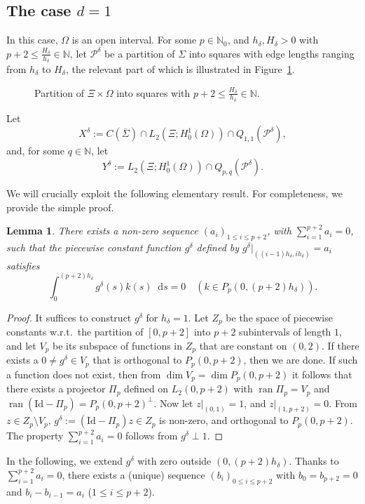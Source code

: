 \documentclass{amsart}
\newtheorem{lemma}[theorem]{Lemma}
\numberwithin{equation}{section}
\newcommand{\N}{\mathbb N}
\newcommand{\identity}{\mathrm{Id}}
\DeclareMathOperator{\ran}{ran}
\newcommand{\1}{\mathbb 1}
\newcommand*\diff{\mathop{}\!\mathrm{d}}
\newcommand{\pria}{{\mathcal P}}
\begin{document}
\subsection{The case $d=1$}
In this case, $\Omega$ is an open interval. 
For some $p \in \N_0$, and $h_\delta, H_\delta >0$ with $p+2 \leq \frac{H_\delta}{h_\delta} \in \N$, let $\pria^\delta$ be a partition of $\Sigma$ into squares with edge lengths ranging from $h_\delta$ to $H_\delta$, the relevant part of which is illustrated in Figure~\ref{fig:1}.
\begin{figure}[h]
\centering

\caption{Partition of $\Xi \times \Omega$ into squares with $p+2\le \frac{H_\delta}{h_\delta}\in\N$.}
\label{fig:1}
\end{figure}
Let
$$
X^\delta := C(\overline{\Sigma}) \cap L_2(\Xi;H_0^1(\Omega)) \cap Q_{1,1}(\pria^\delta),
$$
and, for some $q \in \N$, let 
$$
Y^\delta:=L_2(\Xi;H_0^1(\Omega)) \cap Q_{p,q}(\pria^{\delta}).
$$

We will crucially exploit the following elementary result. For completeness, we provide the simple proof.

\begin{lemma}
There exists a non-zero sequence $(a_i)_{1 \leq i \leq p+2}$, with $\sum_{i=1}^{p+2} a_i=0$, such that the piecewise constant function $g^\delta$ defined by $g^\delta|_{((i-1) h_\delta,i h_\delta)}=a_i$ satisfies
$$
\int_0^{(p+2)h_\delta} g^\delta(s) k(s)\diff s=0 \quad (k \in P_p(0,(p+2)h_\delta)).
$$
\end{lemma}

\begin{proof}
It suffices to construct $g^\delta$ for $h_\delta=1$.
Let $Z_p$ be the space of piecewise constants w.r.t.~the partition of $[0,p+2]$ into $p+2$ subintervals of length $1$, and let $V_p$ be its subspace of functions in $Z_p$ that are constant on $(0,2)$. If there exists a $0 \neq g^\delta \in V_p$ that is orthogonal to 
$P_p(0,p+2)$, then we are done.
If such a function does not exist, then from $\dim V_p=\dim P_{p}(0,p+2)$ it follows that there exists a projector $\Pi_p$ defined on $L_2(0,p+2)$ with $\ran \Pi_p=V_p$ and $\ran (\identity - \Pi_p)=P_p(0,p+2)^\perp$.
Now let $z|_{(0,1)}=1$, and $z|_{(1,p+2)}=0$. From $z \in Z_p \setminus V_p$, $g^\delta:=(\identity - \Pi_p) z \in Z_p$ is non-zero, and orthogonal to $P_p(0,p+2)$. 
The property $\sum_{i=1}^{p+2} a_i=0$ follows from $g^\delta \perp 1$.
\end{proof}

In the following, we extend $g^\delta$ with zero outside $(0,(p+2)h_\delta)$.
Thanks to $\sum_{i=1}^{p+2} a_i=0$, there exists a (unique) sequence $(b_i)_{0 \leq i \leq p+2}$ with $b_0=b_{p+2}=0$ and $b_i-b_{i-1}=a_i$ ($1 \leq i \leq p+2$).
\end{document}
